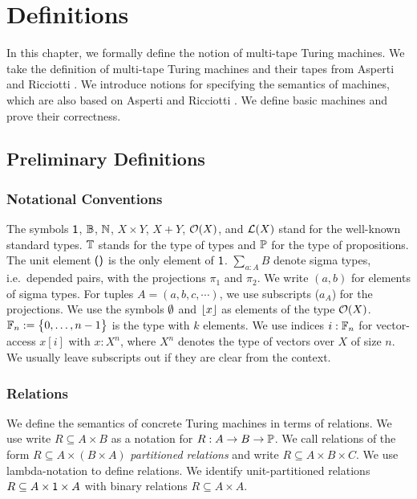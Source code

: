 \chapter{Definitions}
\label{chap:definitions}

In this chapter, we formally define the notion of multi-tape Turing machines.  We take the definition of multi-tape Turing machines and their tapes
from Asperti and Ricciotti \cite{asperti2015}.  We introduce notions for specifying the semantics of machines, which are also based on Asperti and
Ricciotti \cite{asperti2015}.  We define basic machines and prove their correctness.

\section{Preliminary Definitions}
\label{sec:prelim}


\subsection{Notational Conventions}
\label{sec:notational-conventions}

The symbols $\textsf{1}$, $\mathbb{B}$, $\mathbb{N}$, $X \times Y$, $X + Y$, $\mathcal{O}(X)$, and $\mathcal{L}(X)$ stand for the well-known standard types.  $\mathbb{T}$ stands for
the type of types and $\mathbb{P}$ for the type of propositions.  The unit element $\textsf{()}$ is the only element of $\textsf{1}$.  $\sum_{a:A} B$ denote sigma
types, i.e.\ depended pairs, with the projections $\pi_1$ and $\pi_2$.  We write $(a,b)$ for elements of sigma types.  For tuples
$A = (a, b, c, \cdots)$, we use subscripts ($a_A$) for the projections.  We use the symbols $\emptyset$ and $\left\lfloor {x} \right\rfloor$ as elements of the type
$\mathcal{O}(X)$.  $\mathbb{F}_n := \bigl\{ 0, \dots, n-1 \bigr \}$ is the type with $k$ elements.  We use indices $i:\mathbb{F}_n$ for vector-access $x[i]$ with $x:X^n$,
where $X^n$ denotes the type of vectors over $X$ of size $n$.  We usually leave subscripts out if they are clear from the context.


\subsection{Relations}
\label{sec:relations}

We define the semantics of concrete Turing machines in terms of relations.  We use write $R \subseteq A \times B$ as a notation for
$R : A \rightarrow B \rightarrow \mathbb{P}$.  We call relations of the form $R \subseteq A \times (B \times A)$ \emph{partitioned relations} and write
$R \subseteq A \times B \times C$.  We use lambda-notation to define relations.  We identify unit-partitioned relations
$R \subseteq A \times \textsf{1} \times A$ with binary relations $R \subseteq A \times A$.


